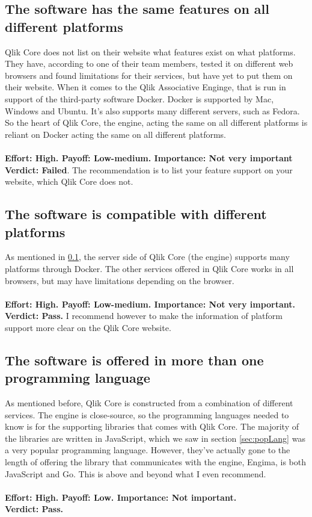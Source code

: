 \documentclass{cslthse-msc}
\begin{document}
    \subsection{The software has the same features on all different platforms}\label{features}
    Qlik Core does not list on their website what features exist on what platforms. They have, according to one of their team members, tested it on different web browsers and found limitations for their services, but have yet to put them on their website. When it comes to the Qlik Associative Enginge, that is run in support of the third-party software Docker. Docker is supported by Mac, Windows and Ubuntu. It's also supports many different servers, such as Fedora. So the heart of Qlik Core, the engine, acting the same on all different platforms is reliant on Docker acting the same on all different platforms.\\\\
    \textbf{Effort: High. Payoff: Low-medium. Importance: Not very important}\\
    \textbf{Verdict: Failed}. The recommendation is to list your feature support on your website, which Qlik Core does not.
    \subsection{The software is compatible with different platforms}
    As mentioned in \ref{features}, the server side of Qlik Core (the engine) supports many platforms through Docker. The other services offered in Qlik Core works in all browsers, but may have limitations depending on the browser. \\\\
    \textbf{Effort: High. Payoff: Low-medium. Importance: Not very important.}\\
    \textbf{Verdict: Pass.} I recommend however to make the information of platform support more clear on the Qlik Core website.
    \subsection{The software is offered in more than one programming language}
    As mentioned before, Qlik Core is constructed from a combination of different services. The engine is close-source, so the programming languages needed to know is for the supporting libraries that comes with Qlik Core. The majority of the libraries are written in JavaScript, which we saw in section \ref{sec:popLang} was a very popular programming language. However, they've actually gone to the length of offering the library that communicates with the engine, Engima, is both JavaScript and Go. This is above and beyond what I even recommend.\\\\
    \textbf{Effort: High. Payoff: Low. Importance: Not important.}\\
    \textbf{Verdict: Pass.}
\end{document}
